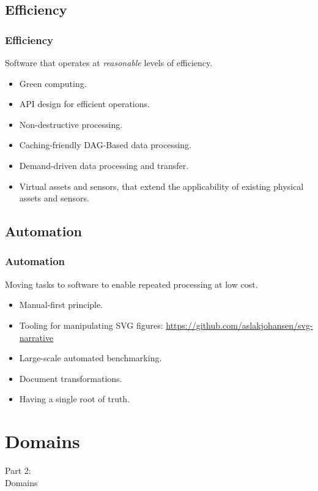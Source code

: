 \subsection{Efficiency}
\begin{frame}
  \frametitle{Efficiency}
  \vspace{3mm}
  Software that operates at \textsl{reasonable} levels of efficiency.
  \vspace{5mm}
  \begin{itemize}
    \item Green computing.
    \item API design for efficient operations.
    \item Non-destructive processing.
    \item Caching-friendly DAG-Based data processing.
    \item Demand-driven data processing and transfer.
    \item Virtual assets and sensors, that extend the applicability of existing physical assets and sensors.
    \end{itemize}
\end{frame}

\subsection{Automation}
\begin{frame}
  \frametitle{Automation}
  \vspace{3mm}
  Moving tasks to software to enable repeated processing at low cost.
  \vspace{5mm}
  \begin{itemize}
    \item Manual-first principle.
    \item Tooling for manipulating SVG figures:
      \url{https://github.com/aslakjohansen/svg-narrative}
    \item Large-scale automated benchmarking.
    \item Document transformations.
    \item Having a single root of truth.
  \end{itemize}
\end{frame}

\section{Domains}
\begin{frame}
  \vspace{25mm}
  \begin{center}
    \Huge{Part 2:\\Domains}
  \end{center}
\end{frame}

